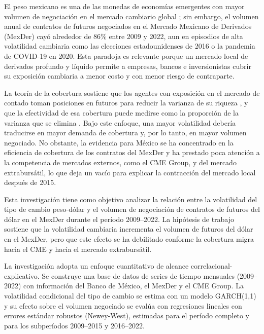 

El peso mexicano es una de las monedas de economías emergentes con mayor volumen de negociación en el mercado cambiario global \parencite{bis2022}; sin embargo, el volumen anual de contratos de futuros negociados en el Mercado Mexicano de Derivados (MexDer) cayó alrededor de 86\% entre 2009 y 2022, aun en episodios de alta volatilidad cambiaria como las elecciones estadounidenses de 2016 o la pandemia de COVID-19 en 2020. Esta paradoja es relevante porque un mercado local de derivados profundo y líquido permite a empresas, bancos e inversionistas cubrir su exposición cambiaria a menor costo y con menor riesgo de contraparte.

La teoría de la cobertura sostiene que los agentes con exposición en el mercado de contado toman posiciones en futuros para reducir la varianza de su riqueza \parencite{johnson1960}, y que la efectividad de esa cobertura puede medirse como la proporción de la varianza que se elimina \parencite{ederington1979}. Bajo este enfoque, una mayor volatilidad debería traducirse en mayor demanda de cobertura y, por lo tanto, en mayor volumen negociado. No obstante, la evidencia para México se ha concentrado en la eficiencia de cobertura de los contratos del MexDer y ha prestado poca atención a la competencia de mercados externos, como el CME Group, y del mercado extrabursátil, lo que deja un vacío para explicar la contracción del mercado local después de 2015.

Esta investigación tiene como objetivo analizar la relación entre la volatilidad del tipo de cambio peso-dólar y el volumen de negociación de contratos de futuros del dólar en el MexDer durante el período 2009–2022. La hipótesis de trabajo sostiene que la volatilidad cambiaria incrementa el volumen de futuros del dólar en el MexDer, pero que este efecto se ha debilitado conforme la cobertura migra hacia el CME y hacia el mercado extrabursátil.

La investigación adopta un enfoque cuantitativo de alcance correlacional-explicativo. Se construye una base de datos de series de tiempo mensuales (2009–2022) con información del Banco de México, el MexDer y el CME Group. La volatilidad condicional del tipo de cambio se estima con un modelo GARCH(1,1) y su efecto sobre el volumen negociado se evalúa con regresiones lineales con errores estándar robustos (Newey-West), estimadas para el período completo y para los subperíodos 2009–2015 y 2016–2022.

